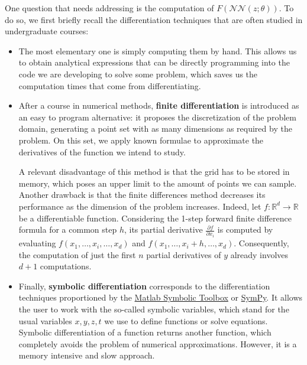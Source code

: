 \documentclass[12pt]{report} %
\newcommand{\tmstrong}[1]{\textbf{#1}}
\begin{document}
One question that needs addressing is the computation of $F
(\mathcal{N}\mathcal{N} (z ; \theta))$. To do so, we first briefly recall the
differentiation techniques that are often studied in undergraduate courses:
\begin{itemize}
  \item The most elementary one is simply computing them by hand. This allows
  us to obtain analytical expressions that can be directly programming into
  the code we are developing to solve some problem, which saves us the
  computation times that come from differentiating.
  
  \item After a course in numerical methods, {\tmstrong{finite
  differentiation}} is introduced as an easy to program alternative: it
  proposes the discretization of the problem domain, generating a point set
  with as many dimensions as required by the problem. On this set, we apply
  known formulae to approximate the derivatives of the function we intend to
  study.
  
  A relevant disadvantage of this method is that the grid has to be stored in memory, which poses an upper
  limit to the amount of points we can sample. Another drawback is that the finite differences method decreases its performance as the
  dimension of the problem increases. Indeed, let $f : \mathbb{R}^d
  \rightarrow \mathbb{R}$ be a differentiable function. Considering the 1-step
  forward finite difference formula for a common step $h$, its partial
  derivative $\frac{\partial f}{\partial x_i}$ is computed by evaluating $f
  (x_1, \ldots, x_i, \ldots, x_d)$ and $f (x_1, \ldots, x_i + h, \ldots,
  x_d)$. Consequently, the computation of just the first $n$ partial
  derivatives of $y$ already involves $d + 1$ computations.
  
    \item Finally, {\tmstrong{symbolic differentiation}} corresponds to the
  differentiation techniques proportioned by the \href{https://www.mathworks.com/help/symbolic/index.html?s\_tid=CRUX\_lftnav}{Matlab Symbolic Toolbox} or \href{https://www.sympy.org/en/index.html}{SymPy}.
  It allows the user to work with the so-called symbolic variables, which
  stand for the usual variables $x, y, z, t$ we use to define functions or
  solve equations. Symbolic differentiation of a function returns another
  function, which completely avoids the problem of numerical approximations.
  However, it is a memory intensive and slow approach.
\end{itemize}
\end{document}
